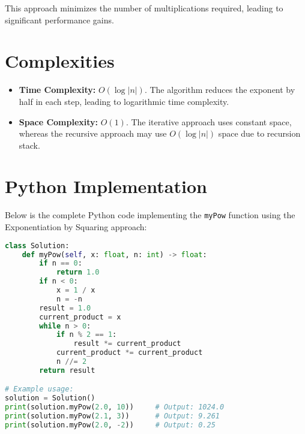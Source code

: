 This approach minimizes the number of multiplications required, leading to significant performance gains.


\section*{Complexities}

\begin{itemize}
    \item \textbf{Time Complexity:} \(O(\log |n|)\). The algorithm reduces the exponent by half in each step, leading to logarithmic time complexity.
    
    \item \textbf{Space Complexity:} \(O(1)\). The iterative approach uses constant space, whereas the recursive approach may use \(O(\log |n|)\) space due to recursion stack.
\end{itemize}

\section*{Python Implementation}


Below is the complete Python code implementing the \texttt{myPow} function using the Exponentiation by Squaring approach:

\begin{fullwidth}
\begin{lstlisting}[language=Python]
class Solution:
    def myPow(self, x: float, n: int) -> float:
        if n == 0:
            return 1.0
        if n < 0:
            x = 1 / x
            n = -n
        result = 1.0
        current_product = x
        while n > 0:
            if n % 2 == 1:
                result *= current_product
            current_product *= current_product
            n //= 2
        return result

# Example usage:
solution = Solution()
print(solution.myPow(2.0, 10))     # Output: 1024.0
print(solution.myPow(2.1, 3))      # Output: 9.261
print(solution.myPow(2.0, -2))     # Output: 0.25
\end{lstlisting}
\end{fullwidth}

